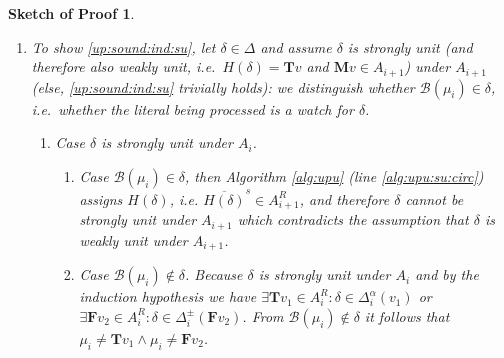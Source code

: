\documentclass[final]{vutinfth} %
\newtheorem{proof-sketch}{Sketch of Proof}[chapter]
\newcommand{\negstrong}[1]{\overline{#1}^s}
\newcommand{\bpro}{\mathcal{B}}
\newcommand{\ass}{A}
\newcommand{\bT}{\mathbf{T}}
\newcommand{\bM}{\mathbf{M}}
\newcommand{\bF}{\mathbf{F}}
\newcommand{\contradiction}{\Lightning}
\newcommand{\dpm}{\Delta^\pm}
\newcommand{\dal}{\Delta^\alpha}
\newcommand{\headf}{H}
\newcommand{\sgl}{\mu}
\begin{document}
\begin{proof-sketch}
\begin{enumerate}
\item To show \ref{up:sound:ind:su}, let $\delta \in \Delta$ and assume $\delta$ is strongly unit (and therefore also weakly unit, i.e.~$\headf(\delta) = \bT v$ and $\bM v \in \ass_{i+1}$) under $\ass_{i+1}$ (else, \ref{up:sound:ind:su} trivially holds): we distinguish whether $\bpro(\sgl_i) \in \delta$, i.e.~whether the literal being processed is a watch for $\delta$.
\begin{enumerate}
	\item Case $\delta$ is strongly unit under $\ass_i$.
	\begin{enumerate}
		\item Case $\bpro(\sgl_i) \in \delta$, then Algorithm \ref{alg:upu} (line \ref{alg:upu:su:circ}) assigns $\headf(\delta)$, i.e. $\negstrong{\headf(\delta)} \in \ass_{i+1}^R$, and therefore $\delta$ cannot be strongly unit under $\ass_{i+1}$ which contradicts the assumption that $\delta$ is weakly unit under $\ass_{i+1}$.
		\item Case $\bpro(\sgl_i) \not \in \delta$. Because $\delta$ is strongly unit under $\ass_i$ and by the induction hypothesis we have $\exists {\bT v_1} \in \ass_i^R : \delta \in \dal_i(v_1)$ or $\exists {\bF v_2} \in \ass_i^R : \delta \in \dpm_i({\bF v_2})$.
		From $\bpro(\sgl_i) \not \in \delta$ it follows that $\sgl_i \not = {\bT v_1} \wedge \sgl_i \not = {\bF v_2}$.	


\end{enumerate}
\end{enumerate}
\end{enumerate}
\end{proof-sketch}
\end{document}
